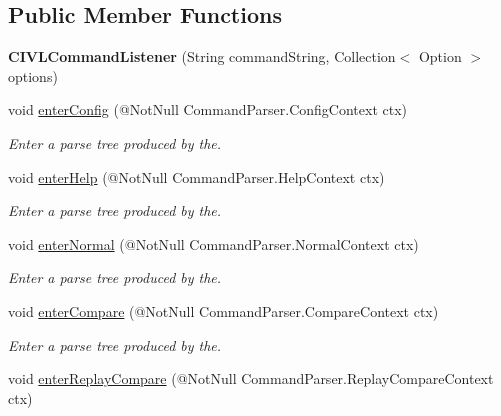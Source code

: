 \subsection*{Public Member Functions}
\begin{DoxyCompactItemize}
\item 
\hypertarget{classedu_1_1udel_1_1cis_1_1vsl_1_1civl_1_1run_1_1common_1_1CIVLCommandListener_aa8a845ada3bd075202b60a8157f3dd6f}{}{\bfseries C\+I\+V\+L\+Command\+Listener} (String command\+String, Collection$<$ Option $>$ options)\label{classedu_1_1udel_1_1cis_1_1vsl_1_1civl_1_1run_1_1common_1_1CIVLCommandListener_aa8a845ada3bd075202b60a8157f3dd6f}

\item 
void \hyperlink{classedu_1_1udel_1_1cis_1_1vsl_1_1civl_1_1run_1_1common_1_1CIVLCommandListener_a59593590c16003563420f21f1a05980c}{enter\+Config} (@Not\+Null Command\+Parser.\+Config\+Context ctx)
\begin{DoxyCompactList}\small\item\em Enter a parse tree produced by the. \end{DoxyCompactList}\item 
void \hyperlink{classedu_1_1udel_1_1cis_1_1vsl_1_1civl_1_1run_1_1common_1_1CIVLCommandListener_a54d80e09e8bfa73475e2c8ad8733a1b7}{enter\+Help} (@Not\+Null Command\+Parser.\+Help\+Context ctx)
\begin{DoxyCompactList}\small\item\em Enter a parse tree produced by the. \end{DoxyCompactList}\item 
void \hyperlink{classedu_1_1udel_1_1cis_1_1vsl_1_1civl_1_1run_1_1common_1_1CIVLCommandListener_aec17bba0b96a8d56efd40b9ff32a645f}{enter\+Normal} (@Not\+Null Command\+Parser.\+Normal\+Context ctx)
\begin{DoxyCompactList}\small\item\em Enter a parse tree produced by the. \end{DoxyCompactList}\item 
void \hyperlink{classedu_1_1udel_1_1cis_1_1vsl_1_1civl_1_1run_1_1common_1_1CIVLCommandListener_ac48ea05c7d57b362f3d57f4dcd47fb7d}{enter\+Compare} (@Not\+Null Command\+Parser.\+Compare\+Context ctx)
\begin{DoxyCompactList}\small\item\em Enter a parse tree produced by the. \end{DoxyCompactList}\item 
void \hyperlink{classedu_1_1udel_1_1cis_1_1vsl_1_1civl_1_1run_1_1common_1_1CIVLCommandListener_a2038497aa7286b04ae19c08ffed034ae}{enter\+Replay\+Compare} (@Not\+Null Command\+Parser.\+Replay\+Compare\+Context ctx)

\end{DoxyCompactItemize}
